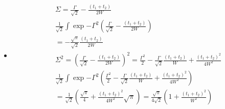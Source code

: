    \begin{itemize}
    \item 
     \begin{equation}
      \begin{split}
      &\Sigma = \frac{\Gamma}{\sqrt{2}}-\frac{(t_1+t_2)}{2W}\\
      &\frac{1}{\sqrt{2}}\int \exp{-\Gamma^2} \left(\frac{\Gamma}{\sqrt{2}}-\frac{(t_1+t_2)}{2W}\right)   \\
      &=-\frac{\sqrt{\pi}}{\sqrt{2}}\frac{(t_1+t_2)}{2W}\\
      &\Sigma^2 = \left(\frac{\Gamma}{\sqrt{2}}-\frac{(t_1+t_2)}{2W}\right)^2 = \frac{\Gamma^2}{2} - \frac{\Gamma}{\sqrt{2}}\frac{(t_1+t_2)}{W} + \frac{(t_1+t_2)^2}{4W^2}\\
      &\frac{1}{\sqrt{2}}\int \exp{-\Gamma^2} \left(\frac{\Gamma^2}{2} - \frac{\Gamma}{\sqrt{2}}\frac{(t_1+t_2)}{W} + \frac{(t_1+t_2)^2}{4W^2}\right)   \\
      &= \frac{1}{\sqrt{2}} \left(\frac{\sqrt{\pi}}{4} + \frac{(t_1+t_2)^2}{4W^2}\sqrt{\pi}\right) = \frac{\sqrt{\pi}}{4\sqrt{2}} \left(1 + \frac{(t_1+t_2)^2}{W^2}\right) \\
     \end{split}
    \end{equation}
   \end{itemize}
 





